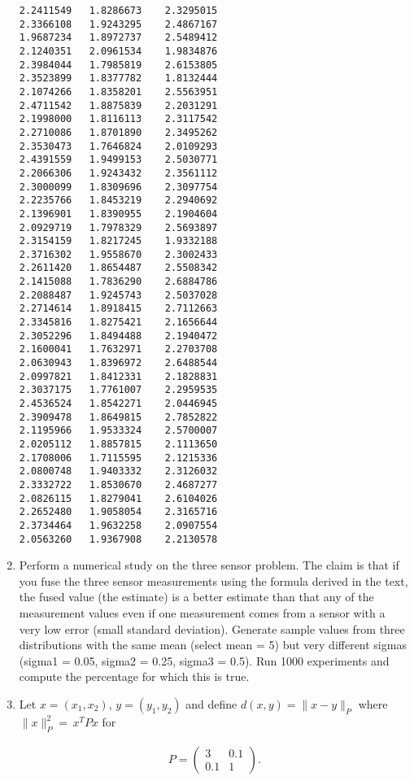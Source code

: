 \begin{enumerate}
\begin{verbatim}
2.2411549   1.8286673    2.3295015
2.3366108   1.9243295    2.4867167
1.9687234   1.8972737    2.5489412
2.1240351   2.0961534    1.9834876
2.3984044   1.7985819    2.6153805
2.3523899   1.8377782    1.8132444
2.1074266   1.8358201    2.5563951
2.4711542   1.8875839    2.2031291
2.1998000   1.8116113    2.3117542
2.2710086   1.8701890    2.3495262
2.3530473   1.7646824    2.0109293
2.4391559   1.9499153    2.5030771
2.2066306   1.9243432    2.3561112
2.3000099   1.8309696    2.3097754
2.2235766   1.8453219    2.2940692
2.1396901   1.8390955    2.1904604
2.0929719   1.7978329    2.5693897
2.3154159   1.8217245    1.9332188
2.3716302   1.9558670    2.3002433
2.2611420   1.8654487    2.5508342
2.1415088   1.7836290    2.6884786
2.2088487   1.9245743    2.5037028
2.2714614   1.8918415    2.7112663
2.3345816   1.8275421    2.1656644
2.3052296   1.8494488    2.1940472
2.1600041   1.7632971    2.2703708
2.0630943   1.8396972    2.6488544
2.0997821   1.8412331    2.1828831
2.3037175   1.7761007    2.2959535
2.4536524   1.8542271    2.0446945
2.3909478   1.8649815    2.7852822
2.1195966   1.9533324    2.5700007
2.0205112   1.8857815    2.1113650
2.1708006   1.7115595    2.1215336
2.0800748   1.9403332    2.3126032
2.3332722   1.8530670    2.4687277
2.0826115   1.8279041    2.6104026
2.2652480   1.9058054    2.3165716
2.3734464   1.9632258    2.0907554
2.0563260   1.9367908    2.2130578
\end{verbatim}
\item
  Perform a numerical study on the three sensor problem. The claim is
  that if you fuse the three sensor measurements using the formula
  derived in the text, the fused value (the estimate) is a better
  estimate than that any of the measurement values even if one
  measurement comes from a sensor with a very low error (small standard
  deviation). Generate sample values from three distributions with the
  same mean (select mean = 5) but very different sigmas (sigma1 = 0.05,
  sigma2 = 0.25, sigma3 = 0.5). Run 1000 experiments and compute the
  percentage for which this is true.
\item
  Let \(x = (x_1,x_2)\), \(y=(y_1,y_2)\) and define
  \(d(x,y) = \| x - y\|_P\) where \(\| x \|_P^2 =\, x^TPx\) for

  \[\begin{aligned}
  P = \left( \begin{array}{cc} 3 & 0.1 \\ 0.1 & 1
  \end{array}\right).
  \end{aligned}\]


\end{enumerate}
